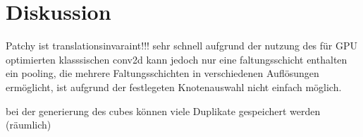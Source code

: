 \section{Diskussion}
\label{diskussion}

Patchy ist translationsinvaraint!!! sehr schnell aufgrund der nutzung des für GPU optimierten klasssischen conv2d
kann jedoch nur eine faltungsschicht enthalten
ein pooling, die mehrere Faltungsschichten in verschiedenen Auflösungen ermöglicht, ist aufgrund der festlegeten Knotenauswahl nicht einfach möglich.

bei der generierung des cubes können viele Duplikate gespeichert werden (räumlich)
